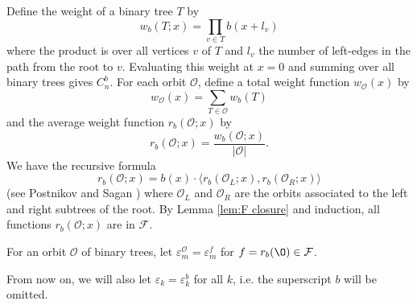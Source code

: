 Define the weight of a binary tree $T$ by
\[w_b(T; x)=\prod_{v\in T}b(x+l_v)\]
where the product is over all vertices $v$ of $T$ and $l_v$ the number of left-edges in the path from the root to $v$. Evaluating this weight at $x=0$ and summing over all binary trees gives $C^b_n$. For each orbit $\mathcal{O}$, define a total weight function $w_{\mathcal{O}}(x)$ by
\[w_{\mathcal{O}}(x)=\sum_{T\in\mathcal{O}}w_b(T)\]
and the average weight function $r_b(\mathcal{O}; x)$ by
\[r_b(\mathcal{O}; x)=\frac{w_b(\mathcal{O}; x)}{\lvert\mathcal{O}\rvert}.\]
We have the recursive formula
\[r_b(\mathcal{O}; x)=b(x)\cdot\langle r_b(\mathcal{O}_L; x), r_b(\mathcal{O}_R; x)\rangle\]
(see Postnikov and Sagan \cite{postnikov2007power}) where $\mathcal{O}_L$ and $\mathcal{O}_R$ are the orbits associated to the left and right subtrees of the root. By Lemma \ref{lem:F closure} and induction, all functions $r_b(\mathcal{O}; x)$ are in $\mathcal{F}$.

\begin{definition}\label{def:epsilonO}
For an orbit $\mathcal{O}$ of binary trees, let $\varepsilon^{\mathcal{O}}_m=\varepsilon^f_m$ for $f=r_b(\O)\in \mathcal{F}$.
\end{definition}

From now on, we will also let $\varepsilon_k=\varepsilon^b_k$ for all $k$, i.e. the superscript $b$ will be omitted.

